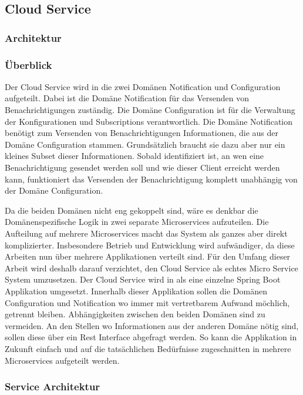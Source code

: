 
\subsection{Cloud Service}\label{subsec:cloud-service}

\subsubsection{Architektur}

\subsubsection*{Überblick}

Der Cloud Service wird in die zwei Domänen Notification und Configuration aufgeteilt.
Dabei ist die Domäne Notification für das Versenden von Benachrichtigungen zuständig.
Die Domäne Configuration ist für die Verwaltung der Konfigurationen und Subscriptions verantwortlich.
Die Domäne Notification benötigt zum Versenden von Benachrichtigungen Informationen, die aus der Domäne Configuration stammen.
Grundsätzlich braucht sie dazu aber nur ein kleines Subset dieser Informationen.
Sobald identifiziert ist, an wen eine Benachrichtigung gesendet werden soll und wie dieser Client erreicht werden kann, funktioniert das Versenden der Benachrichtigung komplett unabhängig von der Domäne Configuration.

Da die beiden Domänen nicht eng gekoppelt sind, wäre es denkbar die Domänenspezifische Logik in zwei separate Microservices aufzuteilen.
Die Aufteilung auf mehrere Microservices macht das System als ganzes aber direkt komplizierter.
Insbesondere Betrieb und Entwicklung wird aufwändiger, da diese Arbeiten nun über mehrere Applikationen verteilt sind.
Für den Umfang dieser Arbeit wird deshalb darauf verzichtet, den Cloud Service als echtes Micro Service System umzusetzen.
Der Cloud Service wird in als eine einzelne Spring Boot Applikation umgesetzt.
Innerhalb dieser Applikation sollen die Domänen Configuration und Notification wo immer mit vertretbarem Aufwand möchlich, getrennt bleiben.
Abhängigkeiten zwischen den beiden Domänen sind zu vermeiden.
An den Stellen wo Informationen aus der anderen Domäne nötig sind, sollen diese über ein Rest Interface abgefragt werden.
So kann die Applikation in Zukunft einfach und auf die tatsächlichen Bedürfnisse zugeschnitten in mehrere Microservices aufgeteilt werden.

\clearpage

\subsubsection*{Service Architektur}

